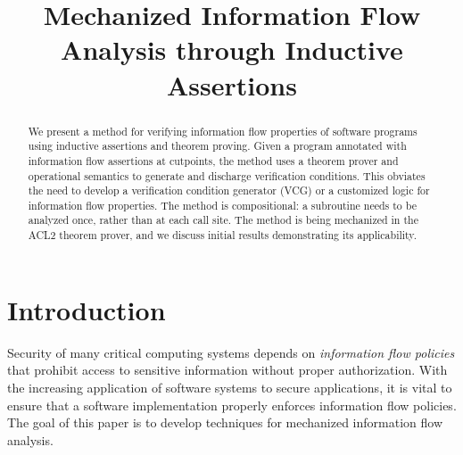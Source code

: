 \documentclass[conference]{IEEEtran}
\begin{document}
\title{Mechanized Information Flow Analysis through Inductive Assertions}

\author{
}



\maketitle

\begin{abstract}

We present a method for verifying information flow properties of
software programs using inductive assertions and theorem proving.
Given a program annotated with information flow assertions at
cutpoints, the method uses a theorem prover and operational semantics
to generate and discharge verification conditions.  This obviates the
need to develop a verification condition generator (VCG) or a
customized logic for information flow properties.  The method is
compositional: a subroutine needs to be analyzed once, rather than at
each call site.  The method is being mechanized in the ACL2 theorem
prover, and we discuss initial results demonstrating its
applicability.

\end{abstract}


\section{Introduction}
\label{sec:intro}

Security of many critical computing systems depends on {\em
information flow policies} that prohibit access to sensitive
information without proper authorization.  With the increasing
application of software systems to secure applications, it is vital
to ensure that a software implementation properly enforces information
flow policies.  The goal of this paper is to develop techniques for
mechanized information flow analysis.
\end{document}
